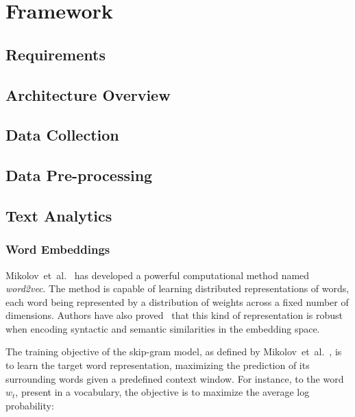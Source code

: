 \chapter{Framework} \label{chap:framework}

\section*{}

\section{Requirements}\label{sec:requirements}

\section{Architecture Overview}\label{sec:architecture}

\section{Data Collection}\label{sec:data_collection}

\section{Data Pre-processing}\label{sec:data_preprocessing}

\section{Text Analytics}\label{sec:text_analytics}

\subsection{Word Embeddings}
Mikolov~et~al.~\cite{mikolov2013efficient} has developed a powerful computational method named \emph{word2vec}. The method is capable of learning distributed representations of words, each word being represented by a distribution of weights across a fixed number of dimensions. Authors have also proved~\cite{mikolov2013linguistic} that this kind of representation is robust when encoding syntactic and semantic similarities in the embedding space.

The training objective of the skip-gram model, as defined by Mikolov~et~al.~\cite{mikolov2013linguistic}, is to learn the target word representation, maximizing the prediction of its surrounding words given a predefined context window. For instance, to the word $w_t$, present in a vocabulary, the objective is to maximize the average log probability:

